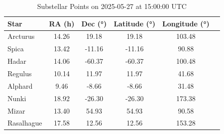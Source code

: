 \documentclass[a4paper,12pt]{extarticle}
\begin{document}
\begin{table}[H]
	\centering
	\begin{tabular}{lccccc}
		\hline
		\textbf{Star} & \textbf{RA (h)} & \textbf{Dec (°)} & \textbf{Latitude (°)} & \textbf{Longitude (°)} \\
		\hline
		Arcturus     & 14.26 &  19.18  &  19.18  & 103.48 \\
		Spica        & 13.42 & -11.16  & -11.16  &  90.88 \\
		Hadar        & 14.06 & -60.37  & -60.37  & 100.48 \\
		Regulus      & 10.14 &  11.97  &  11.97  &  41.68 \\
		Alphard      &  9.46 &  -8.66  &  -8.66  &  31.48 \\
		Nunki        & 18.92 & -26.30  & -26.30  & 173.38 \\
		Mizar        & 13.40 &  54.93  &  54.93  &  90.58 \\
		Rasalhague   & 17.58 &  12.56  &  12.56  & 153.28 \\
		\hline
	\end{tabular}
	\caption{Substellar Points on 2025-05-27 at 15:00:00 UTC}
\end{table}
\end{document}
